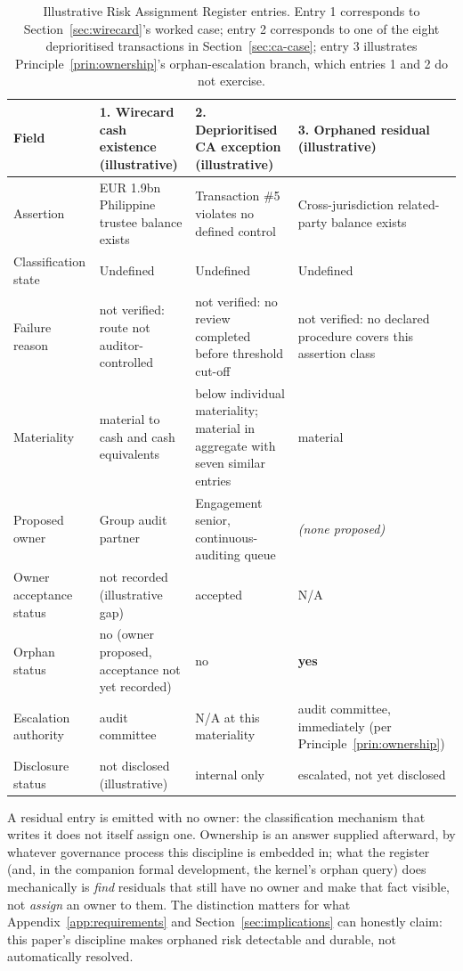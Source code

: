 \documentclass[11pt,a4paper]{article}
\theoremstyle{definition}
\theoremstyle{remark}
\begin{document}
\begin{table}[htbp]
\centering
\small
\begin{tabular}{>{\raggedright\arraybackslash}p{2.2cm}>{\raggedright\arraybackslash}p{3.4cm}>{\raggedright\arraybackslash}p{3.4cm}>{\raggedright\arraybackslash}p{3.4cm}}
\toprule
\textbf{Field} & \textbf{1. Wirecard cash existence (illustrative)} & \textbf{2. Deprioritised CA exception (illustrative)} & \textbf{3. Orphaned residual (illustrative)} \\
\midrule
Assertion & EUR 1.9bn Philippine trustee balance exists & Transaction \#5 violates no defined control & Cross-jurisdiction related-party balance exists \\
Classification state & Undefined & Undefined & Undefined \\
Failure reason & not verified: route not auditor-controlled & not verified: no review completed before threshold cut-off & not verified: no declared procedure covers this assertion class \\
Materiality & material to cash and cash equivalents & below individual materiality; material in aggregate with seven similar entries & material \\
Proposed owner & Group audit partner & Engagement senior, continuous-auditing queue & \emph{(none proposed)} \\
Owner acceptance status & not recorded (illustrative gap) & accepted & N/A \\
Orphan status & no (owner proposed, acceptance not yet recorded) & no & \textbf{yes} \\
Escalation authority & audit committee & N/A at this materiality & audit committee, immediately (per Principle~\ref{prin:ownership}) \\
Disclosure status & not disclosed (illustrative) & internal only & escalated, not yet disclosed \\
\bottomrule
\end{tabular}
\caption{Illustrative Risk Assignment Register entries. Entry 1 corresponds to Section~\ref{sec:wirecard}'s worked case; entry 2 corresponds to one of the eight deprioritised transactions in Section~\ref{sec:ca-case}; entry 3 illustrates Principle~\ref{prin:ownership}'s orphan-escalation branch, which entries 1 and 2 do not exercise.}
\label{tab:rarentries}
\end{table}

A residual entry is emitted with no owner: the classification mechanism that writes it does not itself assign one. Ownership is an answer supplied afterward, by whatever governance process this discipline is embedded in; what the register (and, in the companion formal development, the kernel's orphan query) does mechanically is \emph{find} residuals that still have no owner and make that fact visible, not \emph{assign} an owner to them. The distinction matters for what Appendix~\ref{app:requirements} and Section~\ref{sec:implications} can honestly claim: this paper's discipline makes orphaned risk detectable and durable, not automatically resolved.
\end{document}
